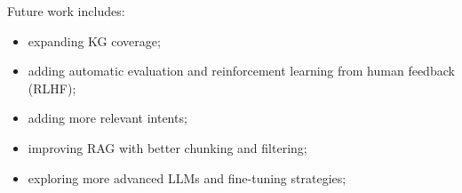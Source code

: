 \documentclass{article}
\begin{document}
Future work includes:
\begin{itemize}
  \item expanding KG coverage;
  \item adding automatic evaluation and reinforcement learning from human feedback (RLHF);
  \item adding more relevant intents;
  \item improving RAG with better chunking and filtering;
  \item exploring more advanced LLMs and fine-tuning strategies;
\end{itemize}



\tiny
\end{document}
